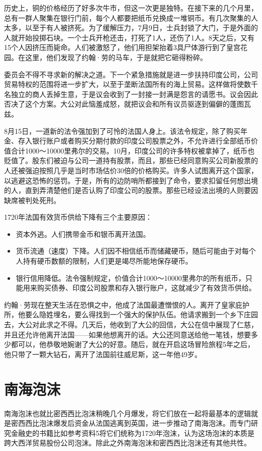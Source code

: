 \documentclass[12pt,oneside]{book}
\begin{document}
\begin{mdframed}
历史上，铜的价格经历了好多次牛市，但这一次更是独特。在接下来的几个月里，总有一群人聚集在银行门前，每个人都要把纸币兑换成一堆铜币。有几次聚集的人太多，以至于有人被挤死。为了缓解压力，7月9日，士兵封锁了大门，于是外面的人就开始投掷石块。一个士兵开枪还击，打死了1人，还伤了1人。8天之后，又有15个人因挤压而毙命。人们被激怒了，他们用担架抬着3具尸体游行到了皇宫花园。在这里，他们发现了约翰·劳的马车，于是就把它砸得粉碎。

委员会不得不寻求新的解决之道。下一个紧急措施就是进一步扶持印度公司，公司贸易特权的范围将进一步扩大，以至于垄断法国所有的海上贸易。这样做将使数千名独立的商人丢掉生意，于是议会收到了一封接一封满是怨言的请愿书。议会因此否决了这个方案。大公对此恼羞成怒，就把议会和所有议员驱逐到偏僻的蓬图瓦兹。

8月15日，一道新的法令强加到了可怜的法国人身上。该法令规定，除了购买年金、存入银行账户或者购买分期付款的印度公司股票之外，不允许进行全部纸币价值合计1000～10000里弗尔的交易。10月，印度公司的许多特权被拿掉了，纸币也贬值了。股东们被迫与公司一道持有股票，而且，那些已经同意购买公司新股票的人还被强迫按照几乎是当时市场估价30倍的价格购买。许多人试图离开这个国家，以逃避这恐怖的惩罚。于是，所有的边防哨所都接到了命令，要求扣留任何想出境的人，直到弄清楚他们是否认购了印度公司的股票。那些已经设法出境的人则要因缺席被判处死刑。

1720年法国有效货币供给下降有三个主要原因：

\begin{itemize}
\item 资本外逃。人们携带金币和银币离开法国。
\item 货币流通（速度）下降。人们因不相信纸币而储藏硬币，随后可能由于对每个人持有硬币数额的限制，人们更是竭尽所能地保存硬币。
\item 银行信用降低。法令强制规定，价值合计1000～10000里弗尔的所有纸币，只能用来购买债券、印度公司股票和存入银行账户，这就减少了有效货币供给。
\end{itemize}

约翰·劳现在整天生活在恐惧之中，他成了法国最遭憎恨的人。离开了皇家庇护所，他要么隐姓埋名，要么得找到一个强大的保护队伍。他请求搬到一个乡下庄园去，大公对此求之不得。几天后，他收到了大公的回信，大公在信中展现了仁慈，并且还允许他离开法国——如果他想离开的话。大公还同意送给他一笔钱，想要多少都可以，他恭敬地婉谢了大公的好意。随后，就在开启这场冒险旅程5年之后，他只带了一颗大钻石，离开了法国前往威尼斯，这一年他49岁。
\end{mdframed}

\section{南海泡沫}
南海泡沫也就比密西西比泡沫稍晚几个月爆发，将它们放在一起将最基本的逻辑就是密西西比泡沫爆发后资金从法国逃离到英国，进一步推动了南海泡沫。而专门研究金融史的书籍比如参考资料5将它们统称为1720年泡沫，认为这场泡沫的本质是跨大西洋贸易股份公司泡沫。除此之外南海泡沫和密西西比泡沫还有其他共性。
\end{document}
